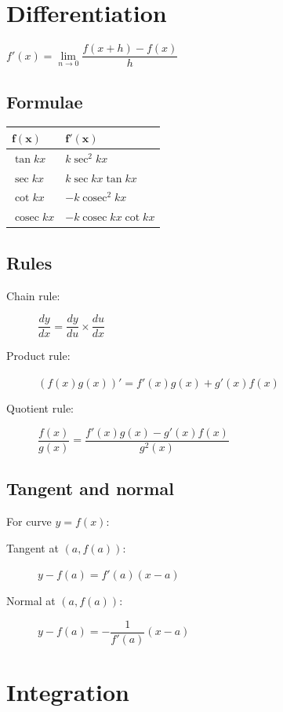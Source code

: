 \documentclass[A4paper]{article}
\DeclareMathOperator\cosec{cosec}
\begin{document}
	\pagebreak

	\section{Differentiation}

	$f'(x) = \lim\limits_{n \to 0}\dfrac{f(x+h)-f(x)}{h}$

	\subsection{Formulae}
	\begin{tabular}{|l|l|}
		\hline
		$\mathbf{f(x)}$ & $\mathbf{f'(x)}$ \\
		\hline
		$\tan kx$ & $k\sec^2 kx$ \\
		\hline
		$\sec kx$ & $k\sec kx \tan kx$ \\
		\hline
		$\cot kx$ & $-k\cosec^2 kx$ \\
		\hline
		$\cosec kx$ & $-k\cosec kx \cot kx$ \\
		\hline
	\end{tabular}

	\subsection{Rules}
	\begin{description}
		\item[Chain rule:] $\dfrac{dy}{dx} = \dfrac{dy}{du} \times \dfrac{du}{dx}$
		\item[Product rule:] $(f(x)g(x))'=f'(x)g(x)+g'(x)f(x)$
		\item[Quotient rule:] $\dfrac{f(x)}{g(x)} = \dfrac{f'(x)g(x)-g'(x)f(x)}{g^2(x)}$
	\end{description}


	\subsection{Tangent and normal}
	For curve $y=f(x)$:
	\begin{description}
		\item[Tangent at $(a,f(a))$:] $y-f(a)=f'(a)(x-a)$
		\item[Normal at $(a,f(a))$:] $y-f(a)=-\dfrac{1}{f'(a)}(x-a)$
	\end{description}




	\pagebreak

	\section{Integration}
	
\end{document}

